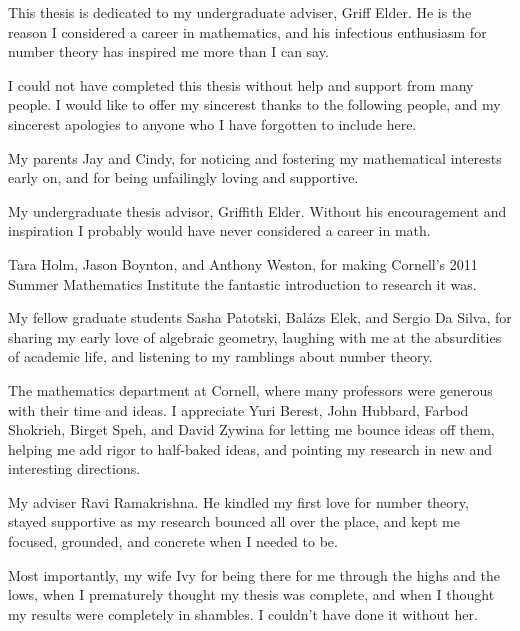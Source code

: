\documentclass[phd,tocprelim]{cornell}
\begin{document}
\begin{dedication}
This thesis is dedicated to my undergraduate adviser, Griff Elder. He is the 
reason I considered a career in mathematics, and his infectious enthusiasm 
for number theory has inspired me more than I can say. 
\end{dedication}





\begin{acknowledgements}
I could not have completed this thesis without help and support from many 
people. I would like to offer my sincerest thanks to the following people, and 
my sincerest apologies to anyone who I have forgotten to include here. 

My parents Jay and Cindy, for noticing and fostering my mathematical 
interests early on, and for being unfailingly loving and supportive. 

My undergraduate thesis advisor, Griffith Elder. Without his encouragement 
and inspiration I probably would have never considered a career in math. 

Tara Holm, Jason Boynton, and Anthony Weston, for making Cornell's 2011 Summer 
Mathematics Institute the fantastic introduction to research it was. 

My fellow graduate students Sasha Patotski, Bal\'azs Elek, and Sergio Da 
Silva, for sharing my early love of algebraic geometry, laughing with me at the 
absurdities of academic life, and listening to my ramblings about number theory. 

The mathematics department at Cornell, where many professors were generous 
with their time and ideas. I appreciate Yuri Berest, John Hubbard, Farbod 
Shokrieh, Birget Speh, and David Zywina for letting me bounce ideas off them, 
helping me add rigor to half-baked ideas, and pointing my research in new and 
interesting directions. 

My adviser Ravi Ramakrishna. He kindled my first love for number theory, 
stayed supportive as my research bounced all over the place, and kept me 
focused, grounded, and concrete when I needed to be. 

Most importantly, my wife Ivy for being there for me through the highs 
and the lows, when I prematurely thought my thesis was complete, and when I 
thought my results were completely in shambles. I couldn't have done it without 
her. 
\end{acknowledgements}
\end{document}
